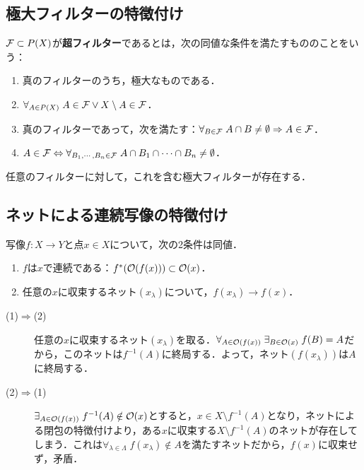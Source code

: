 \documentclass[uplatex,dvipdfmx]{jsreport}
\begin{document}
\subsection{極大フィルターの特徴付け}

\begin{theorem}
    $\mathcal{F}\subset P(X)$が\textbf{超フィルター}であるとは，次の同値な条件を満たすもののことをいう：
    \begin{enumerate}
        \item 真のフィルターのうち，極大なものである．
        \item $\forall_{A\in P(X)}\;A\in\mathcal{F}\lor X\setminus A\in\mathcal{F}$．
        \item 真のフィルターであって，次を満たす：$\forall_{B\in\mathcal{F}}\;A\cap B\ne\emptyset\Rightarrow A\in\mathcal{F}$．
        \item $A\in\mathcal{F}\Leftrightarrow\forall_{B_1,\cdots,B_n\in\mathcal{F}}\;A\cap B_1\cap\cdots\cap B_n\ne\emptyset$．
    \end{enumerate}
\end{theorem}

\begin{proposition}[(AC)]
    任意のフィルターに対して，これを含む極大フィルターが存在する．
\end{proposition}

\subsection{ネットによる連続写像の特徴付け}

\begin{proposition}
    写像$f:X\to Y$と点$x\in X$について，次の2条件は同値．
    \begin{enumerate}
        \item $f$は$x$で連続である：$f^*(\mathcal{O}(f(x)))\subset\mathcal{O}(x)$．
        \item 任意の$x$に収束するネット$(x_\lambda)$について，$f(x_\lambda)\to f(x)$．
    \end{enumerate}
\end{proposition}
\begin{Proof}\mbox{}
    \begin{description}
        \item[(1)$\Rightarrow$(2)] 任意の$x$に収束するネット$(x_\lambda)$を取る．$\forall_{A\in\mathcal{O}(f(x))}\;\exists_{B\in\mathcal{O}(x)}\;f(B)=A$だから，このネットは$f^{-1}(A)$に終局する．よって，ネット$(f(x_\lambda))$は$A$に終局する．
        \item[(2)$\Rightarrow$(1)] $\exists_{A\in\mathcal{O}(f(x))}\;f^{-1}(A)\notin\mathcal{O}(x)$とすると，$x\in X\setminus f^{-1}(A)$となり，ネットによる閉包の特徴付けより，ある$x$に収束する$X\setminus f^{-1}(A)$のネットが存在してしまう．これは$\forall_{\lambda\in\Lambda}\;f(x_\lambda)\notin A$を満たすネットだから，$f(x)$に収束せず，矛盾．
    \end{description}
\end{Proof}
\end{document}
